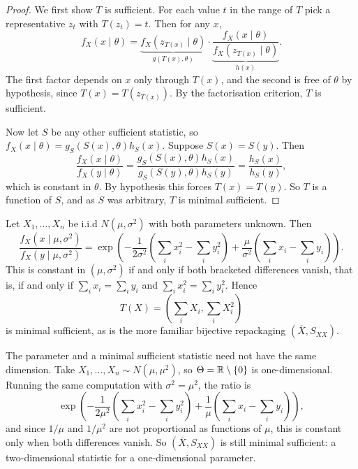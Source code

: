 \documentclass[a4paper]{scrartcl}
\begin{document}
\begin{proof}
  We first show $T$ is sufficient. For each value $t$ in the range of $T$ pick a representative $z_t$ with $T(z_t) = t$. Then for any $x$,
  $$
  f_X(x \mid \theta) = \underbrace{f_X\left(z_{T(x)} \mid \theta\right)}_{g(T(x), \theta)}\cdot \underbrace{\frac{f_X(x\mid\theta)}{f_X\left(z_{T(x)}\mid\theta\right)}}_{h(x)}.
  $$
  The first factor depends on $x$ only through $T(x)$, and the second is free of $\theta$ by hypothesis, since $T(x) = T(z_{T(x)})$. By the factorisation criterion, $T$ is sufficient.

  Now let $S$ be any other sufficient statistic, so $f_X(x\mid\theta) = g_S(S(x),\theta)h_S(x)$. Suppose $S(x) = S(y)$. Then
  $$
  \frac{f_X(x\mid\theta)}{f_X(y\mid\theta)} = \frac{g_S(S(x),\theta)h_S(x)}{g_S(S(y),\theta)h_S(y)} = \frac{h_S(x)}{h_S(y)},
  $$
  which is constant in $\theta$. By hypothesis this forces $T(x) = T(y)$. So $T$ is a function of $S$, and as $S$ was arbitrary, $T$ is minimal sufficient.
\end{proof}

\begin{example}
  Let $X_1, \dots, X_n$ be i.i.d $N(\mu,\sigma^2)$ with both parameters unknown. Then
  $$
  \frac{f_X(x\mid\mu,\sigma^2)}{f_X(y\mid\mu,\sigma^2)} = \exp\left(-\frac{1}{2\sigma^2}\left(\sum_i x_i^2 - \sum_i y_i^2\right) + \frac{\mu}{\sigma^2}\left(\sum_i x_i - \sum_i y_i\right)\right).
  $$
  This is constant in $(\mu, \sigma^2)$ if and only if both bracketed differences vanish, that is, if and only if $\sum_i x_i = \sum_i y_i$ and $\sum_i x_i^2 = \sum_i y_i^2$. Hence
  $$
  T(X) = \left(\sum_i X_i, \sum_i X_i^2\right)
  $$
  is minimal sufficient, as is the more familiar bijective repackaging $(\overline{X}, S_{XX})$.
\end{example}

\begin{example}
  The parameter and a minimal sufficient statistic need not have the same dimension. Take $X_1, \dots, X_n \sim N(\mu, \mu^2)$, so $\Theta = \mathbb{R}\setminus\{0\}$ is one-dimensional. Running the same computation with $\sigma^2 = \mu^2$, the ratio is
  $$
  \exp\left(-\frac{1}{2\mu^2}\left(\sum_i x_i^2 - \sum_i y_i^2\right) + \frac{1}{\mu}\left(\sum_i x_i - \sum_i y_i\right)\right),
  $$
  and since $1/\mu$ and $1/\mu^2$ are not proportional as functions of $\mu$, this is constant only when both differences vanish. So $(\overline{X}, S_{XX})$ is still minimal sufficient: a two-dimensional statistic for a one-dimensional parameter.
\end{example}
\end{document}
